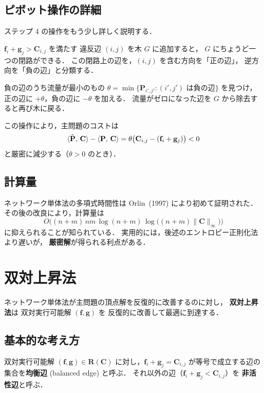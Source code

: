 \subsection{ピボット操作の詳細}\label{subsec:ns-pivot}

ステップ 4 の操作をもう少し詳しく説明する．

$\mathbf{f}_i + \mathbf{g}_j > \mathbf{C}_{i,j}$ を満たす
違反辺 $(i, j)$ を木 $G$ に追加すると，
$G$ にちょうど一つの閉路ができる．
この閉路上の辺を，$(i,j)$ を含む方向を「正の辺」，
逆方向を「負の辺」と分類する．

負の辺のうち流量が最小のもの
$\theta = \min\{\mathbf{P}_{i',j'} : (i',j') \text{ は負の辺}\}$
を見つけ，正の辺に $+\theta$，負の辺に $-\theta$ を加える．
流量がゼロになった辺を $G$ から除去すると再び木に戻る．

この操作により，主問題のコストは
\[
  \langle \tilde{\mathbf{P}},\, \mathbf{C} \rangle - \langle \mathbf{P},\, \mathbf{C} \rangle
  = \theta \bigl(\mathbf{C}_{i,j} - (\mathbf{f}_i + \mathbf{g}_j)\bigr)
  < 0
\]
と厳密に減少する（$\theta > 0$ のとき）．

\subsection{計算量}\label{subsec:ns-complexity}

ネットワーク単体法の多項式時間性は
Orlin~(1997) により初めて証明された．
その後の改良により，計算量は
\[
  O\bigl((n+m)\, nm\, \log(n+m)\, \log\bigl((n+m)\|\mathbf{C}\|_\infty\bigr)\bigr)
\]
に抑えられることが知られている．
実用的には，後述のエントロピー正則化法より遅いが，
\textbf{厳密解}が得られる利点がある．


\section{双対上昇法}\label{sec:dual-ascent}

ネットワーク単体法が主問題の頂点解を反復的に改善するのに対し，
\textbf{双対上昇法}は
双対実行可能解 $(\mathbf{f}, \mathbf{g})$ を
反復的に改善して最適に到達する．

\subsection{基本的な考え方}\label{subsec:da-idea}

双対実行可能解 $(\mathbf{f}, \mathbf{g}) \in \mathbf{R}(\mathbf{C})$
に対し，$\mathbf{f}_i + \mathbf{g}_j = \mathbf{C}_{i,j}$
が等号で成立する辺の集合を\textbf{均衡辺} (balanced edge) と呼ぶ．
それ以外の辺（$\mathbf{f}_i + \mathbf{g}_j < \mathbf{C}_{i,j}$）を
\textbf{非活性辺}と呼ぶ．

